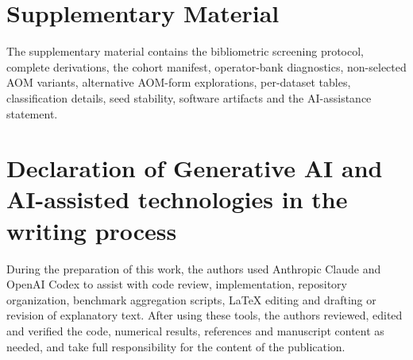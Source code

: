 \documentclass[11pt,a4paper]{article}
\begin{document}
\begin{table}[t]
  \centering
  \caption{Software artifacts and validation status.}
  \label{tab:software}
  \small
  
\end{table}

\section*{Supplementary Material}

The supplementary material contains the bibliometric screening protocol,
complete derivations, the cohort manifest, operator-bank diagnostics,
non-selected AOM variants, alternative AOM-form explorations, per-dataset
tables, classification details, seed stability, software artifacts and the
AI-assistance statement.

\section*{Declaration of Generative AI and AI-assisted technologies in the writing process}

During the preparation of this work, the authors used Anthropic Claude and
OpenAI Codex to assist with code review, implementation, repository
organization, benchmark aggregation scripts, LaTeX editing and drafting or
revision of explanatory text.  After using these tools, the authors reviewed,
edited and verified the code, numerical results, references and manuscript
content as needed, and take full responsibility for the content of the
publication.



\end{document}
